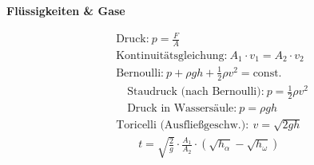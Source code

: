 \begin{minipage}[t]{.35\textwidth}%



\textbf{Flüssigkeiten \& Gase}\par \vspace*{-4mm}
\begin{align*}
&\text{Druck:} ~ p = \frac{F}{A} \\
&\text{Kontinuitätsgleichung:} ~ A_1 \cdot v_1 = A_2 \cdot v_2 \\
&\text{Bernoulli:} 		~ p + \rho g h + \frac{1}{2} \rho v^2 = \text{const.} \\[-4pt]
&\quad \text{Staudruck (nach Bernoulli):} ~ p = \frac{1}{2} \rho v^2 \\[-4pt]
&\quad \text{Druck in Wassersäule:} ~ p = \rho gh \\
&\text{Toricelli (Ausfließgeschw.)}: ~ v = \sqrt{2gh} \\[-2pt]
&\qquad t = \sqrt{\frac{2}{g}} \cdot \frac{A_1}{A_2} \cdot (\sqrt{h_{\alpha}}-\sqrt{h_{\omega}})
\end{align*}


\end{minipage}
